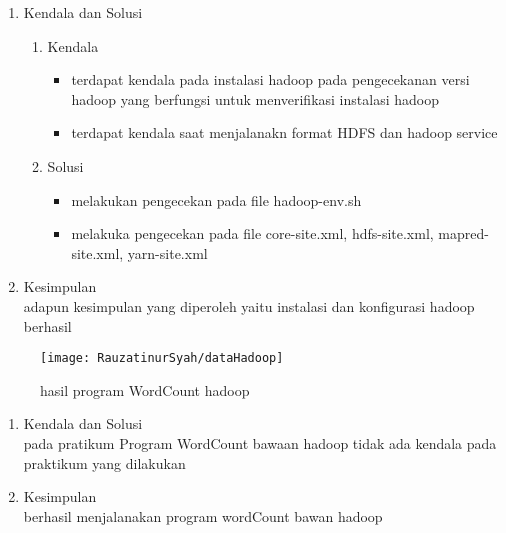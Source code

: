 

\begin{enumerate}
\item Kendala dan Solusi\\
\begin{enumerate}
\item Kendala
\begin{itemize}
\item terdapat kendala pada instalasi hadoop pada pengecekanan versi hadoop yang berfungsi untuk menverifikasi instalasi hadoop
\item terdapat kendala saat menjalanakn format HDFS dan hadoop service
\end{itemize}
\item Solusi \\
\begin{itemize}
\item melakukan pengecekan pada file hadoop-env.sh
\item melakuka  pengecekan pada file core-site.xml, hdfs-site.xml, mapred-site.xml, yarn-site.xml
\end{itemize}
\end{enumerate}

\item Kesimpulan\\
adapun kesimpulan yang diperoleh yaitu instalasi dan konfigurasi hadoop berhasil 
\end{enumerate}

\begin{figure}[!ht]
\texttt{[image: RauzatinurSyah/dataHadoop]}
\caption{hasil program WordCount hadoop}
\label{gam:Hasil}
\end{figure}

\begin{enumerate}
\item Kendala dan Solusi\\
pada pratikum Program WordCount bawaan hadoop tidak ada kendala pada praktikum yang dilakukan
\item Kesimpulan\\
berhasil menjalanakan program wordCount bawan hadoop
\end{enumerate}


